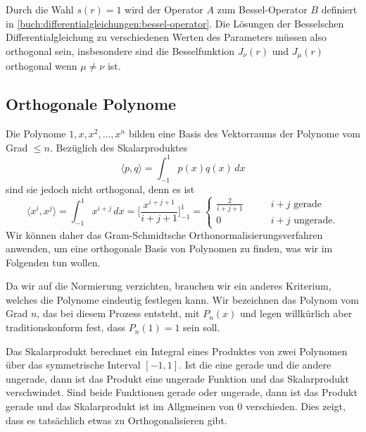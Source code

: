 Durch die Wahl $s(r)=1$ wird der Operator $A$ zum Bessel-Operator
$B$ definiert in
\eqref{buch:differentialgleichungen:bessel-operator}.
Die Lösungen der Besselschen Differentialgleichung zu verschiedenen Werten
des Parameters müssen also orthogonal sein, insbesondere sind die
Besselfunktion $J_\nu(r)$ und $J_\mu(r)$ orthogonal wenn $\mu\ne\nu$ ist.

%
%
\subsection{Orthogonale Polynome
\label{buch:integral:subsection:orthogonale-polynome}}
Die Polynome $1,x,x^2,\dots,x^n$ bilden eine Basis des Vektorraums
der Polynome vom Grad $\le n$.
Bezüglich des Skalarproduktes
\[
\langle p,q\rangle
=
\int_{-1}^1 p(x)q(x)\,dx
\]
sind sie jedoch nicht orthogonal, denn es ist
\[
\langle x^i,x^j\rangle
=
\int_{-1}^1 x^{i+j}\,dx
=
\biggl[\frac{x^{i+j+1}}{i+j+1}\biggr]_{-1}^1
=
\begin{cases}
\displaystyle
\frac{2}{i+j+1}&\qquad\text{$i+j$ gerade}\\
              0&\qquad\text{$i+j$ ungerade}.
\end{cases}
\]
Wir können daher das Gram-Schmidtsche Orthonormalisierungsverfahren
anwenden, um eine orthogonale Basis von Polynomen zu finden, was
wir im Folgenden tun wollen.


Da wir auf die Normierung verzichten, brauchen wir ein anderes
Kriterium, welches die Polynome eindeutig festlegen kann.
Wir bezeichnen das Polynom vom Grad $n$, das bei diesem Prozess
entsteht, mit $P_n(x)$ und legen willkürlich aber traditionskonform
fest, dass $P_n(1)=1$ sein soll.

Das Skalarprodukt berechnet ein Integral eines Produktes von zwei
Polynomen über das symmetrische Interval $[-1,1]$.
Ist die eine gerade und die andere ungerade, dann ist das
Produkt eine ungerade Funktion und das Skalarprodukt verschwindet.
Sind beide Funktionen gerade oder ungerade, dann ist das Produkt
gerade und das Skalarprodukt ist im Allgmeinen von $0$ verschieden.
Dies zeigt, dass es tatsächlich etwas zu Orthogonalisieren gibt.

